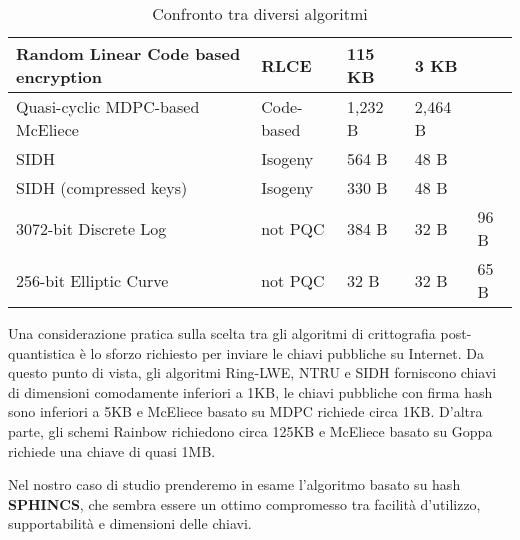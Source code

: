 \begin{table}[]
{\begin{tabular}{|l|l|l|l|l|}
    Random Linear Code based encryption & RLCE           & 115 KB              & 3 KB                 &                    \\ \hline
    Quasi-cyclic MDPC-based McEliece    & Code-based     & 1,232 B             & 2,464 B              &                    \\ \hline
    SIDH                                & Isogeny        & 564 B               & 48 B                 &                    \\ \hline
    SIDH (compressed keys)              & Isogeny        & 330 B               & 48 B                 &                    \\ \hline
    3072-bit Discrete Log               & not PQC        & 384 B               & 32 B                 & 96 B               \\ \hline
    256-bit Elliptic Curve              & not PQC        & 32 B                & 32 B                 & 65 B               \\ \hline
    \end{tabular}
  }
  \caption{Confronto tra diversi algoritmi}
  \label{tab:confronto}
\end{table}

Una considerazione pratica sulla scelta tra gli algoritmi di crittografia post-quantistica è lo sforzo richiesto per inviare le chiavi pubbliche su Internet. Da questo punto di vista, gli algoritmi Ring-LWE, NTRU e SIDH forniscono chiavi di dimensioni comodamente inferiori a 1KB, le chiavi pubbliche con firma hash sono inferiori a 5KB e McEliece basato su MDPC richiede circa 1KB. D'altra parte, gli schemi Rainbow richiedono circa 125KB e McEliece basato su Goppa richiede una chiave di quasi 1MB.

Nel nostro caso di studio prenderemo in esame l'algoritmo basato su hash \textbf{SPHINCS}, che sembra essere un ottimo compromesso tra facilità d'utilizzo, supportabilità e dimensioni delle chiavi.